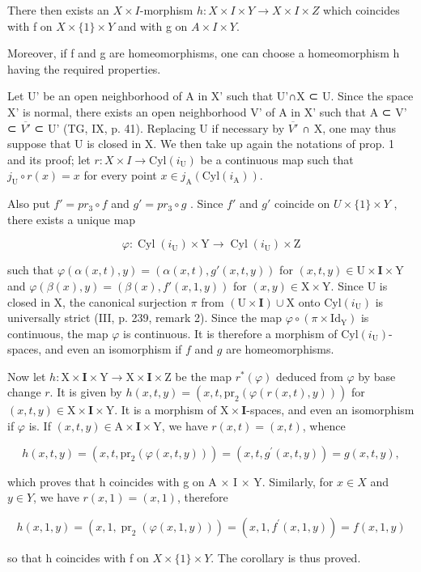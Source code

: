 There then exists an \(X \times I\)-morphism \(h: X \times I \times Y \to X \times I \times Z\) which coincides with f on \(X \times \{1\} \times Y\) and with g on \(A \times I \times Y\).

Moreover, if f and g are homeomorphisms, one can choose a homeomorphism h having the required properties.

Let U' be an open neighborhood of A in X' such that U'∩X ⊂ U. Since the space X' is normal, there exists an open neighborhood V' of A in X' such that A ⊂ V' ⊂ \(\overline{V'}\) ⊂ U' (TG, IX, p. 41). Replacing U if necessary by \(\overline{V'}\) ∩ X, one may thus suppose that U is closed in X. We then take up again the notations of prop. 1 and its proof; let \(r: X \times I \to \text{Cyl}(i_{\text{U}})\) be a continuous map such that \(j_{\text{U}} \circ r(x) = x\) for every point \(x \in j_{\text{A}}(\text{Cyl}(i_{\text{A}}))\).

Also put \(f' = pr_{3} \circ f\) and \(g' = pr_{3} \circ g\) . Since \(f'\) and \(g'\) coincide on \(U \times \{1\} \times Y\) , there exists a unique map

\[
\varphi \colon \operatorname{Cyl} (i _ {\mathrm{U}}) \times \mathrm{Y} \to \operatorname{Cyl} (i _ {\mathrm{U}}) \times \mathrm{Z}
\]

such that \(\varphi(\alpha(x,t),y) = (\alpha(x,t),g'(x,t,y))\) for \((x,t,y) \in \mathrm{U} \times \mathbf{I} \times \mathrm{Y}\) and \(\varphi(\beta(x),y) = (\beta(x),f'(x,1,y))\) for \((x,y) \in \mathrm{X} \times \mathrm{Y}\). Since U is closed in X, the canonical surjection \(\pi\) from \((\mathrm{U} \times \mathbf{I}) \cup \mathrm{X}\) onto \(\mathrm{Cyl}(i_{\mathrm{U}})\) is universally strict (III, p. 239, remark 2). Since the map \(\varphi \circ (\pi \times \mathrm{Id}_{\mathrm{Y}})\) is continuous, the map \(\varphi\) is continuous. It is therefore a morphism of \(\mathrm{Cyl}(i_{\mathrm{U}})\)-spaces, and even an isomorphism if \(f\) and \(g\) are homeomorphisms.

Now let \(h \colon \mathrm{X} \times \mathbf{I} \times \mathrm{Y} \to \mathrm{X} \times \mathbf{I} \times \mathrm{Z}\) be the map \(r^*(\varphi)\) deduced from \(\varphi\) by base change \(r\). It is given by \(h(x,t,y) = (x,t,\mathrm{pr}_2(\varphi(r(x,t),y)))\) for \((x,t,y) \in \mathrm{X} \times \mathbf{I} \times \mathrm{Y}\). It is a morphism of \(\mathrm{X} \times \mathbf{I}\)-spaces, and even an isomorphism if \(\varphi\) is. If \((x,t,y) \in \mathrm{A} \times \mathbf{I} \times \mathrm{Y}\), we have \(r(x,t) = (x,t)\), whence

\[
h (x, t, y) = (x, t, \mathrm{pr} _ {2} (\varphi (x, t, y))) = (x, t, g ^ {\prime} (x, t, y)) = g (x, t, y),
\]

which proves that h coincides with g on A × I × Y. Similarly, for \(x \in X\) and \(y \in Y\), we have \(r(x,1) = (x,1)\), therefore

\[
h (x, 1, y) = (x, 1, \operatorname{pr} _ {2} (\varphi (x, 1, y))) = (x, 1, f ^ {\prime} (x, 1, y)) = f (x, 1, y)
\]

so that h coincides with f on \(X \times \{1\} \times Y\). The corollary is thus proved.

